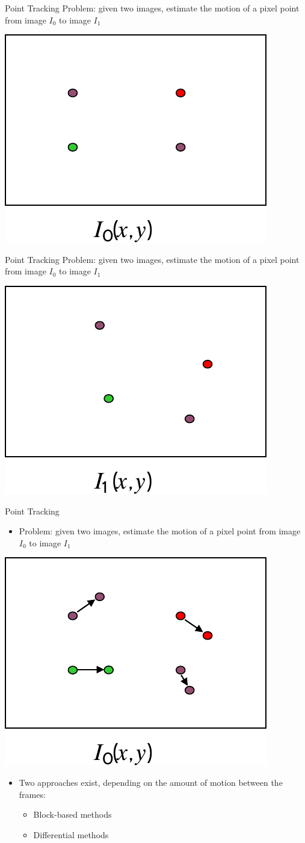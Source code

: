 \begin{frame}{Point Tracking}
  Problem: given two images, estimate the motion of a pixel point from image $I_0$ to image $I_1$
  
  \begin{center}
    \includegraphics[width=0.3\columnwidth]{./images/optical_flow/point_tracking_1.pdf}
  \end{center}

\end{frame}

\begin{frame}{Point Tracking}
  Problem: given two images, estimate the motion of a pixel point from image $I_0$ to image $I_1$
  
  \begin{center}
    \includegraphics[width=0.3\columnwidth]{./images/optical_flow/point_tracking_2.pdf}
  \end{center}
\end{frame}

\begin{frame}{Point Tracking}
  \begin{itemize}
    \item Problem: given two images, estimate the motion of a pixel point from image $I_0$ to image $I_1$
  \end{itemize}

  \begin{center}
    \includegraphics[width=0.3\columnwidth]{./images/optical_flow/point_tracking_3.pdf}
  \end{center}
  
  \begin{itemize}
    \item Two approaches exist, depending on the amount of motion between the frames:
      \begin{itemize}
        \item Block-based methods
        \item Differential methods
      \end{itemize}
  \end{itemize}

\end{frame}

